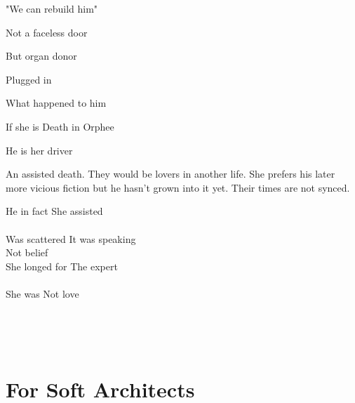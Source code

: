 "We can rebuild him"

Not a faceless door

But organ donor

Plugged in

What happened to him

If she is Death in Orphee

He is her driver

An assisted death. They would be lovers in another life. She prefers his
later more vicious fiction but he hasn't grown into it yet. Their times
are not synced.

He in fact She assisted\\
~\\
Was scattered It was speaking\\
\hspace*{0.333em}\hspace*{0.333em}\hspace*{0.333em}\hspace*{0.333em}\hspace*{0.333em}\hspace*{0.333em}\hspace*{0.333em}\hspace*{0.333em}\hspace*{0.333em}\hspace*{0.333em}\hspace*{0.333em}\hspace*{0.333em}\hspace*{0.333em}\hspace*{0.333em}\hspace*{0.333em}\hspace*{0.333em}\hspace*{0.333em}\hspace*{0.333em}\hspace*{0.333em}\hspace*{0.333em}\hspace*{0.333em}\hspace*{0.333em}\hspace*{0.333em}Not
belief\\
She longed for The expert\\
~\\
She was Not love

~

~

\hypertarget{for-soft-architects}{%
\section{For Soft Architects}\label{for-soft-architects}}

